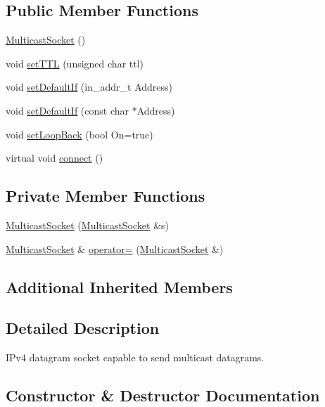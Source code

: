 \subsection*{Public Member Functions}
\begin{DoxyCompactItemize}
\item 
\hyperlink{classMulticastSocket_a757cf27883d58403d8c407ac6e1b9abb}{Multicast\+Socket} ()
\item 
void \hyperlink{classMulticastSocket_abf3fae43ee2575adfc7c90ee31b1fc0a}{set\+T\+TL} (unsigned char ttl)
\item 
void \hyperlink{classMulticastSocket_a64399ca9f96c7f8fcf453c6233d17165}{set\+Default\+If} (in\+\_\+addr\+\_\+t Address)
\item 
void \hyperlink{classMulticastSocket_abd769428b74a9dc88fca8c27bb53da1a}{set\+Default\+If} (const char $\ast$Address)
\item 
void \hyperlink{classMulticastSocket_a3f30553f778aa0bf541fc8d1c772e2e2}{set\+Loop\+Back} (bool On=true)
\item 
virtual void \hyperlink{classMulticastSocket_a30ffd3d7fe782c2d74d69d994e465a4d}{connect} ()
\end{DoxyCompactItemize}
\subsection*{Private Member Functions}
\begin{DoxyCompactItemize}
\item 
\hyperlink{classMulticastSocket_a85ca1e8e1c4c726d906393eec29adf00}{Multicast\+Socket} (\hyperlink{classMulticastSocket}{Multicast\+Socket} \&s)
\item 
\hyperlink{classMulticastSocket}{Multicast\+Socket} \& \hyperlink{classMulticastSocket_a644a16ae716496f9d92389f7a9e80b3e}{operator=} (\hyperlink{classMulticastSocket}{Multicast\+Socket} \&)
\end{DoxyCompactItemize}
\subsection*{Additional Inherited Members}


\subsection{Detailed Description}
I\+Pv4 datagram socket capable to send multicast datagrams. 

\subsection{Constructor \& Destructor Documentation}
\mbox{\label{classMulticastSocket_a757cf27883d58403d8c407ac6e1b9abb}} 
